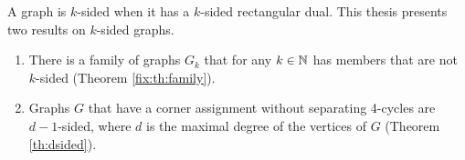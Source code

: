 
  A graph is $k$-sided when it has a $k$-sided rectangular dual. This thesis presents two results on $k$-sided graphs.

  \begin{enumerate}
    \item There is a family of graphs $G_k$ that for any $k \in \mathbb{N}$ has members that are not $k$-sided (Theorem \ref{fix:th:family}).
    \item Graphs $G$ that have a corner assignment without separating 4-cycles are $d-1$-sided, where $d$ is the maximal degree of the vertices of $G$ (Theorem \ref{th:dsided}).
  \end{enumerate}

